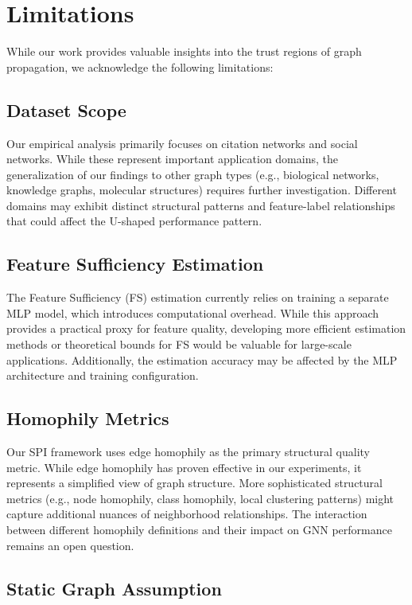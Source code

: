 \section{Limitations}
\label{sec:limitations}

While our work provides valuable insights into the trust regions of graph propagation, we acknowledge the following limitations:

\subsection{Dataset Scope}

Our empirical analysis primarily focuses on citation networks and social networks. While these represent important application domains, the generalization of our findings to other graph types (e.g., biological networks, knowledge graphs, molecular structures) requires further investigation. Different domains may exhibit distinct structural patterns and feature-label relationships that could affect the U-shaped performance pattern.

\subsection{Feature Sufficiency Estimation}

The Feature Sufficiency (FS) estimation currently relies on training a separate MLP model, which introduces computational overhead. While this approach provides a practical proxy for feature quality, developing more efficient estimation methods or theoretical bounds for FS would be valuable for large-scale applications. Additionally, the estimation accuracy may be affected by the MLP architecture and training configuration.

\subsection{Homophily Metrics}

Our SPI framework uses edge homophily as the primary structural quality metric. While edge homophily has proven effective in our experiments, it represents a simplified view of graph structure. More sophisticated structural metrics (e.g., node homophily, class homophily, local clustering patterns) might capture additional nuances of neighborhood relationships. The interaction between different homophily definitions and their impact on GNN performance remains an open question.

\subsection{Static Graph Assumption}

